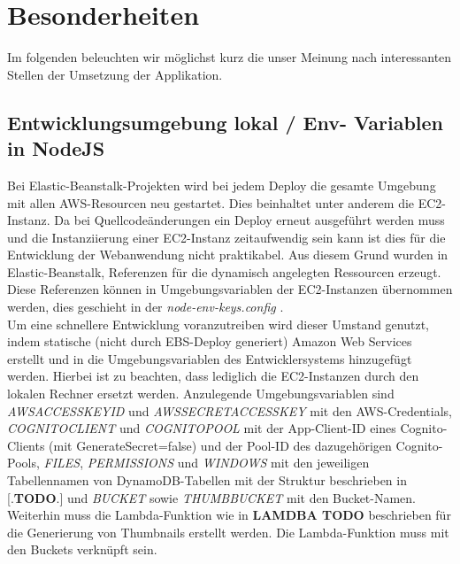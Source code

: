 \documentclass[a4paper, 12pt]{scrreprt}
\renewcommand\_{\textunderscore\allowbreak}
\begin{document}
\chapter{Besonderheiten}
Im folgenden beleuchten wir möglichst kurz die unser Meinung nach interessanten Stellen der Umsetzung der Applikation.

\section{Entwicklungsumgebung lokal / Env- Variablen in NodeJS}

Bei Elastic-Beanstalk-Projekten wird bei jedem Deploy die gesamte Umgebung mit allen AWS-Resourcen neu gestartet. Dies beinhaltet unter anderem die EC2-Instanz. Da bei Quellcodeänderungen ein Deploy erneut ausgeführt werden muss und die Instanziierung einer EC2-Instanz zeitaufwendig sein kann ist dies für die Entwicklung der Webanwendung nicht praktikabel. Aus diesem Grund wurden in Elastic-Beanstalk, Referenzen \cite{AWSDc} für die dynamisch angelegten Ressourcen erzeugt. Diese Referenzen können in Umgebungsvariablen der EC2-Instanzen übernommen werden, dies geschieht in der \textit{node-env-keys.config} \cite{AWSDd}.\\
Um eine schnellere Entwicklung voranzutreiben wird dieser Umstand genutzt, indem statische (nicht durch EBS-Deploy generiert) Amazon Web Services erstellt und in die Umgebungsvariablen des Entwicklersystems hinzugefügt werden.
Hierbei ist zu beachten, dass lediglich die EC2-Instanzen durch den lokalen Rechner ersetzt werden. Anzulegende Umgebungsvariablen sind
\textit{AWS\_ACCESS\_KEY\_ID} und \textit{AWS\_SECRET\_ACCESS\_KEY} mit den AWS-Credentials, \textit{COGNITO\_CLIENT} und \textit{COGNITO\_POOL} mit der App-Client-ID eines Cognito-Clients (mit GenerateSecret=false) und der Pool-ID des dazugehörigen Cognito-Pools, \textit{FILES}, \textit{PERMISSIONS} und \textit{WINDOWS} mit den jeweiligen Tabellennamen von DynamoDB-Tabellen mit der Struktur beschrieben in [.\textbf{TODO}.] und \textit{BUCKET} sowie \textit{THUMB\_BUCKET} mit den Bucket-Namen. Weiterhin muss die Lambda-Funktion wie in \textbf{LAMDBA TODO} beschrieben  für die Generierung von Thumbnails erstellt werden. Die Lambda-Funktion muss mit den Buckets verknüpft sein.  



\end{document}
